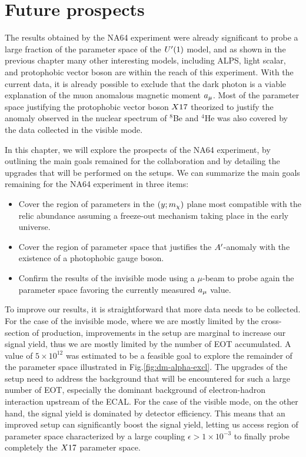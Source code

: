 
\newcommand{\pdirfive}{chapters/plots/chapter5}

\chapter{Future prospects} %
\label{chapter5} %

The results obtained by the NA64 experiment were already significant to probe a large fraction of the parameter space of the $U'(1)$ model, and as shown in the previous chapter many other interesting models, including ALPS, light scalar, and protophobic vector boson are within the reach of this experiment. With the current data, it is already possible to exclude that the dark photon is a viable explanation of the muon anomalous magnetic moment $a_{\mu}$. Most of the parameter space justifying the protophobic vector boson $X17$ theorized to justify the anomaly observed in the nuclear spectrum of $^8$Be and $^4$He was also covered by the data collected in the visible mode.

In this chapter, we will explore the prospects of the NA64 experiment, by outlining the main goals remained for the collaboration and by detailing the upgrades that will be performed on the setups. We can summarize the main goals remaining for the NA64 experiment in three items:

\begin{itemize}
\item Cover the region of parameters in the $(y;m_{\chi})$ plane most compatible with the relic abundance assuming a freeze-out mechanism taking place in the early universe.
\item Cover the region of parameter space that justifies the $A'$-anomaly with the existence of a photophobic gauge boson.  
\item Confirm the results of the invisible mode using a $\mu$-beam to probe again the parameter space favoring the currently measured $a_{\mu}$ value.
\end{itemize}

To improve our results, it is straightforward that more data needs to be collected. For the case of the invisible mode, where we are mostly limited by the cross-section of production, improvements in the setup are marginal to increase our signal yield, thus we are mostly limited by the number of EOT accumulated. A value of $5 \times 10^{12}$ was estimated to be a feasible goal to explore the remainder of the parameter space illustrated in Fig.\ref{fig:dm-alpha-excl}. The upgrades of the setup need to address the background that will be encountered for such a large number of EOT, especially the dominant background of electron-hadron interaction upstream of the ECAL.
For the case of the visible mode, on the other hand, the signal yield is dominated by detector efficiency. This means that an improved setup can significantly boost the signal yield, letting us access region of parameter space characterized by a large coupling $\epsilon > 1 \times 10^{-3}$ to finally probe completely the $X17$ parameter space.

